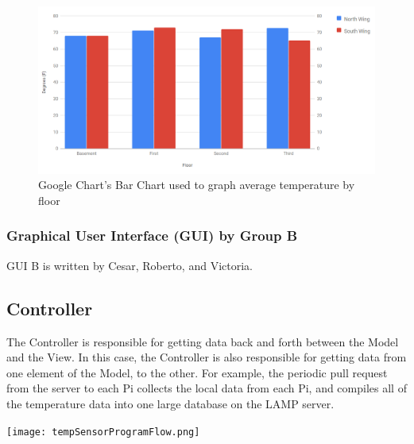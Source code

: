 \documentclass{article}
\begin{document}
				\begin{figure}[H]
					\begin{center}						
						\includegraphics[scale=.5]{averageFloorTemp.PNG}				
					\end{center}
					\captionsetup{labelformat=empty}
					\caption{Google Chart's Bar Chart used to graph average temperature by floor}
				\end{figure}			
			
			\subsubsection{Graphical User Interface (GUI) by Group B}
				GUI B is written by  Cesar, Roberto, and Victoria.
								
			
	\newpage		
			
		\subsection{Controller}
			The Controller is responsible for getting data back and forth between the Model and the View. In this case, the Controller
			is also responsible for getting data from one element of the Model, to the other. For example, the periodic pull request 
			from the server to each Pi collects the local data from each Pi, and compiles all of the temperature data into one large
			database on the LAMP server.
			
			\begin{center}
				\texttt{[image: tempSensorProgramFlow.png]}\\
			\end{center}
					
\end{document}
